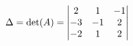 \documentclass[preview]{standalone}
\begin{document}
\begin{align*}
\special{dvisvgm:raw <g id='unique000'>}\Delta = \det(A) = \begin{vmatrix} 2 & 1 & -1 \\ -3 & -1 & 2 \\ -2 & 1 & 2 \end{vmatrix}\special{dvisvgm:raw </g>}
\end{align*}
\end{document}
